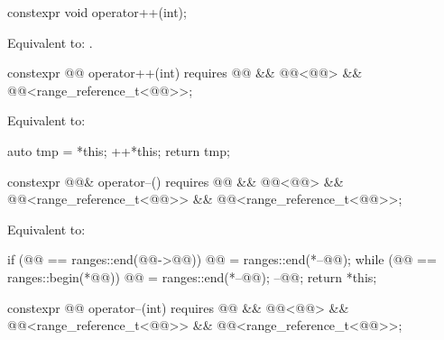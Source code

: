 %
\begin{itemdecl}
constexpr void operator++(int);
\end{itemdecl}

\begin{itemdescr}
\pnum
\effects
Equivalent to: .
\end{itemdescr}

%
\begin{itemdecl}
constexpr @@ operator++(int)
  requires @@ && @@<@@> &&
           @@<range_reference_t<@@>>;
\end{itemdecl}

\begin{itemdescr}
\pnum
\effects
Equivalent to:
\begin{codeblock}
auto tmp = *this;
++*this;
return tmp;
\end{codeblock}
\end{itemdescr}

%
\begin{itemdecl}
constexpr @@& operator--()
  requires @@ && @@<@@> &&
           @@<range_reference_t<@@>> &&
           @@<range_reference_t<@@>>;
\end{itemdecl}

\begin{itemdescr}
\pnum
\effects
Equivalent to:
\begin{codeblock}
if (@@ == ranges::end(@@->@@))
  @@ = ranges::end(*--@@);
while (@@ == ranges::begin(*@@))
  @@ = ranges::end(*--@@);
--@@;
return *this;
\end{codeblock}
\end{itemdescr}

%
\begin{itemdecl}
constexpr @@ operator--(int)
  requires @@ && @@<@@> &&
           @@<range_reference_t<@@>> &&
           @@<range_reference_t<@@>>;
\end{itemdecl}

